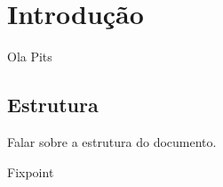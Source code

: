 \chapter{Introdução}\label{chp:intro}
Ola Pits \cite{Pitts2013}


\section{Estrutura}
Falar sobre a estrutura do documento.


\begin{coqcode}
	Fixpoint
\end{coqcode}